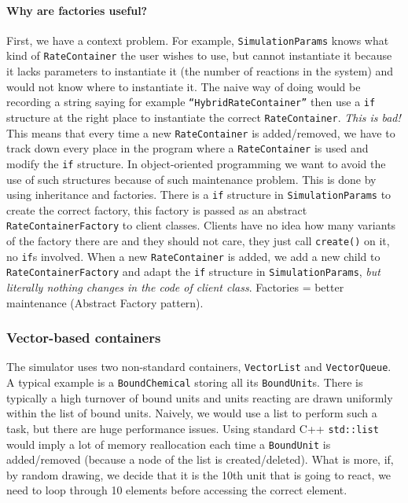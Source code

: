 \paragraph{Why are factories useful?} First, we have a context problem. For example, \texttt{SimulationParams} knows what kind of \texttt{RateContainer} the user wishes to use, but cannot instantiate it because it lacks parameters to instantiate it (the number of reactions in the system) and would not know where to instantiate it. The naive way of doing would be recording a string saying for example \texttt{``HybridRateContainer''} then use a \texttt{if} structure at the right place to instantiate the correct \texttt{RateContainer}. \emph{This is bad!} This means that every time a new \texttt{RateContainer} is added/removed, we have to track down every place in the program where a \texttt{RateContainer} is used and modify the \texttt{if} structure. In object-oriented programming we want to avoid the use of such structures because of such maintenance problem. This is done by using inheritance and factories. There is a \texttt{if} structure in \texttt{SimulationParams} to create the correct factory, this factory is passed as an abstract \texttt{RateContainerFactory} to client classes. Clients have no idea how many variants of the factory there are and they should not care, they just call \texttt{create()} on it, no \texttt{if}s involved. When a new \texttt{RateContainer} is added, we add a new child to \texttt{RateContainerFactory} and adapt the \texttt{if} structure in \texttt{SimulationParams}, \emph{but literally nothing changes in the code of client class}. Factories = better maintenance (Abstract Factory pattern).

\subsubsection{Vector-based containers}

The simulator uses two non-standard containers, \texttt{VectorList} and \texttt{VectorQueue}. A typical example is a \texttt{BoundChemical} storing all its \texttt{BoundUnit}s. There is typically a high turnover of bound units and units reacting are drawn uniformly within the list of bound units. Naively, we would use a list to perform such a task, but there are huge performance issues. Using standard C++ \texttt{std::list} would imply a lot of memory reallocation each time a \texttt{BoundUnit} is added/removed (because a node of the list is created/deleted). What is more, if, by random drawing, we decide that it is the 10th unit that is going to react, we need to loop through 10 elements before accessing the correct element.


